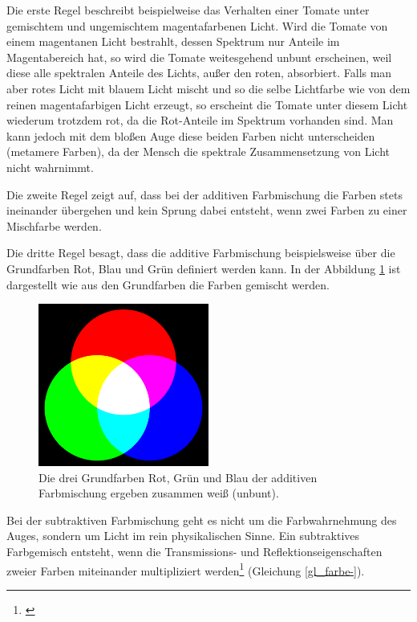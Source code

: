 Die erste Regel beschreibt beispielweise das Verhalten einer Tomate unter gemischtem und ungemischtem magentafarbenen Licht. Wird die Tomate von einem magentanen Licht bestrahlt, dessen Spektrum nur Anteile im Magentabereich hat, so wird die Tomate weitesgehend unbunt erscheinen, weil diese alle spektralen Anteile des Lichts, außer den roten, absorbiert. Falls man aber rotes Licht mit blauem Licht mischt und so die selbe Lichtfarbe wie von dem reinen magentafarbigen Licht erzeugt, so erscheint die Tomate unter diesem Licht wiederum trotzdem rot, da die Rot-Anteile im Spektrum vorhanden sind. Man kann jedoch mit dem bloßen Auge diese beiden Farben nicht unterscheiden (metamere Farben), da der Mensch die spektrale Zusammensetzung von Licht nicht wahrnimmt. 

Die zweite Regel zeigt auf, dass bei der additiven Farbmischung die Farben stets ineinander übergehen und kein Sprung dabei entsteht, wenn zwei Farben zu einer Mischfarbe werden.

Die dritte Regel besagt, dass die additive Farbmischung beispielsweise über die Grundfarben Rot, Blau und Grün definiert werden kann. In der Abbildung   \ref{b_farben+} ist dargestellt wie aus den Grundfarben die Farben gemischt werden.

\begin{figure}[H]     %
\centering
\includegraphics[width=0.5\textwidth]{bilder/farben+} 
\caption {Die drei Grundfarben Rot, Grün und Blau der additiven Farbmischung ergeben zusammen weiß (unbunt).\protect\footnotemark}\label{b_farben+}
\end{figure}


Bei der subtraktiven Farbmischung geht es nicht um die Farbwahrnehmung des Auges, sondern um Licht im rein physikalischen Sinne. Ein subtraktives Farbgemisch entsteht, wenn die Transmissions- und Reflektionseigenschaften zweier Farben miteinander multipliziert werden\footnote{\cite[84]{greule}} (Gleichung \ref{gl_farbe-}).

